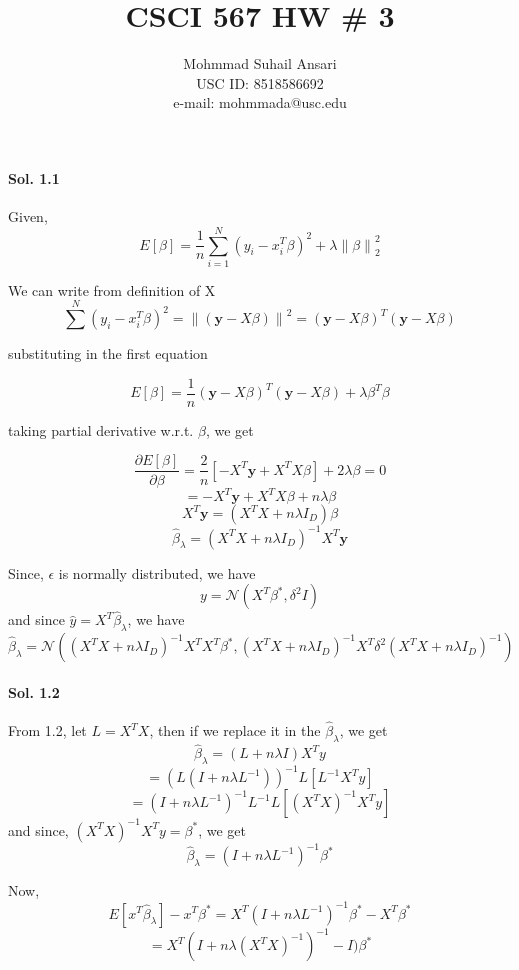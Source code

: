 \documentclass[]{report}
\title{CSCI 567 HW \# 3}
\author{Mohmmad Suhail Ansari \\ USC ID: 8518586692\\e-mail: mohmmada@usc.edu}
\begin{document}
\maketitle

\paragraph{Sol. 1.1}
	Given, 
	\[ E[\beta] = \frac{1}{n} \sum_{i = 1}^{N} {(y_i - x_i^T \beta)}^2 + \lambda {\|\beta\|}_2^2\]

	We can write from definition of X
	\[ \sum^N (y_i - x_i^T \beta)^2 = {\| (\textbf{y} - X \beta)\|}^2 = (\textbf{y} - X \beta)^T (\textbf{y} - X \beta)\]

	substituting in the first equation

	\[ E[\beta] = \frac{1}{n} (\textbf{y} - X \beta)^T (\textbf{y} - X \beta) + \lambda \beta^T \beta \]

	taking partial derivative w.r.t. $\beta$, we get

	\[ \frac{\partial{E[\beta]}}{\partial{\beta}} = \frac{2}{n} [-X^T \textbf{y} + X^T X \beta] + 2 \lambda \beta = 0\]
	\[ = -X^T \textbf{y} + X^T X \beta + n \lambda \beta \]
	\[ X^T \textbf{y} = (X^T X + n \lambda I_D) \beta \]
	\[ \hat{\beta}_\lambda = (X^T X + n \lambda I_D)^{-1} X^T \textbf{y} \]


	Since, $\epsilon$ is normally distributed, we have 
	\[ y = \mathcal{N}(X^T \beta^*, \delta^2 I)\]
	and since $\hat{y} = X^T \hat{\beta}_\lambda$, we have 
	\[ \hat{\beta}_\lambda = \mathcal{N}((X^T X + n \lambda I_D)^{-1} X^T X^T \beta^*, (X^T X + n \lambda I_D)^{-1} X^T \delta^2 (X^T X + n \lambda I_D)^{-1} )\]
	

\paragraph{Sol. 1.2}
	
	From 1.2, let $L = X^T X$, then if we replace it in the $\hat{\beta}_\lambda$, we get 
	\[ \hat{\beta}_\lambda = (L + n \lambda I) X^T y \]
	\[ = (L(I + n\lambda L^{-1}))^{-1} L [L^{-1} X^T y] \]
	\[ = (I + n \lambda L^{-1})^{-1} L^{-1} L [(X^T X)^{-1} X^T y]\]
	and since, $(X^T X)^{-1} X^T y = \beta^*$, we get 
	\[ \hat{\beta}_\lambda = (I + n\lambda L^{-1})^{-1} \beta^* \]

	Now,
	\[ E[ x^T \hat{\beta}_\lambda ] - x^T \beta^* = X^T (I + n\lambda L^{-1})^{-1} \beta^* - X^T \beta^* \]
	\[ = X^T (I + n\lambda (X^T X)^{-1})^{-1} - I) \beta^* \]
\end{document}
